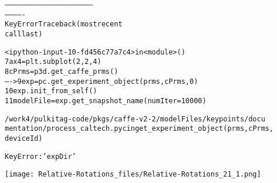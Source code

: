\documentclass[letterpaper,10pt,english]{/usr/share/sphinx/texinputs/sphinxhowto}
\newenvironment{InvisibleVerbatim}
        {\begin{mdframed}[leftmargin=0.1\linewidth,innerleftmargin=3pt,innerrightmargin=3pt, userdefinedwidth=1\linewidth, linewidth=0pt, linecolor=white, usetwoside=false]}
        {\end{mdframed}}
\begin{document}
    

        
        

            
                
            \begin{alltt}

        --------------------------------------------------------------
-------------
    KeyError                                  Traceback (most recent
call last)



        <ipython-input-10-fd456c77a7c4> in <module>()
          7 ax4 = plt.subplot(2,2,4)
          8 cPrms = p3d.get\_caffe\_prms()
    ----> 9 exp = pc.get\_experiment\_object(prms, cPrms,0)
         10 exp.init\_from\_self()
         11 modelFile = exp.get\_snapshot\_name(numIter=10000)




        /work4/pulkitag-code/pkgs/caffe-v2-2/modelFiles/keypoints/docu
mentation/process\_caltech.pyc in get\_experiment\_object(prms, cPrms,
deviceId)




        KeyError: 'expDir'

\end{alltt}
        
            
                \begin{InvisibleVerbatim}
                \vspace{-0.5\baselineskip}
    \begin{center}
    \texttt{[image: Relative-Rotations\_files/Relative-Rotations\_21\_1.png]}
    \par
    \end{center}
    
            \end{InvisibleVerbatim}
            
        
    


\end{document}
